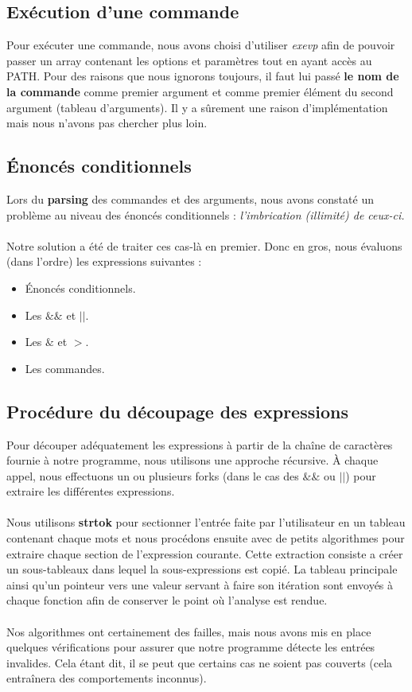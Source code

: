 \documentclass{article}
\begin{document}
\subsection{Exécution d'une commande}

Pour exécuter une commande, nous avons choisi d'utiliser \emph{exevp} afin de pouvoir passer un array contenant les options et paramètres tout en ayant accès au PATH.
Pour des raisons que nous ignorons toujours, il faut lui passé \textbf{le nom de la commande} comme premier argument et comme premier élément du second argument (tableau d'arguments). Il y a sûrement une raison d'implémentation mais nous n'avons pas chercher plus loin.

\subsection{Énoncés conditionnels}

Lors du \textbf{parsing} des commandes et des arguments, nous avons constaté un problème au niveau des énoncés conditionnels : \textit{l'imbrication (illimité) de ceux-ci.}
\\\\
Notre solution a été de traiter ces cas-là en premier. Donc en gros, nous évaluons (dans l’ordre) les expressions suivantes :

\begin{itemize}
    \item Énoncés conditionnels.
    \item Les $\&\&$ et $||$.
    \item Les $\&$ et $>$.
    \item Les commandes.
\end{itemize}

\subsection{Procédure du découpage des expressions}

Pour découper adéquatement les expressions à partir de la chaîne de caractères fournie à notre programme, nous utilisons une approche récursive. À chaque appel, nous effectuons un ou plusieurs forks (dans le cas des $\&\&$ ou $||$) pour extraire les différentes expressions.
\\\\
Nous utilisons \textbf{strtok} pour sectionner l'entrée faite par l'utilisateur en un tableau contenant chaque mots et nous procédons ensuite avec de petits algorithmes pour extraire chaque section de l’expression courante. Cette extraction consiste a créer un sous-tableaux dans lequel la sous-expressions est copié. La tableau principale ainsi qu'un pointeur vers une valeur servant à faire son itération sont envoyés à chaque fonction afin de conserver le point où l'analyse est rendue. 
\\\\
Nos algorithmes ont certainement des failles, mais nous avons mis en place quelques vérifications pour assurer que notre programme détecte les entrées invalides. Cela étant dit, il se peut que certains cas ne soient pas couverts (cela entraînera des comportements inconnus).
\\\\
\end{document}
